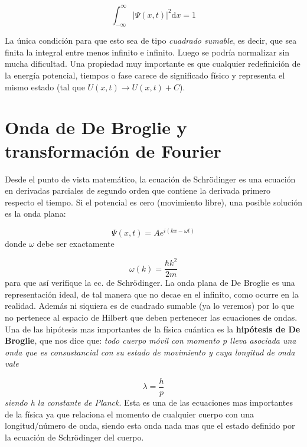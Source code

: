 \documentclass[12pt]{article}
\newcommand{\D}{\mathrm{d}}
\newcommand{\intf}{\int_{-\infty}^{\infty}}
\begin{document}
\begin{equation}
\intf |\Psi (x,t)|^2 \D x = 1
\end{equation}

La única condición para que esto sea de tipo \textit{cuadrado sumable}, es decir, que sea finita la integral entre menos infinito e infinito. Luego se podría normalizar sin mucha dificultad. Una propiedad muy importante es que cualquier redefinición de la energía potencial, tiempos o fase carece de significado físico y representa el mismo estado (tal que $U(x,t) \rightarrow U(x,t) + C$).

\section{Onda de De Broglie y transformación de Fourier}

Desde el punto de vista matemático, la ecuación de Schrödinger es una ecuación en derivadas parciales de segundo orden que contiene la derivada primero respecto el tiempo. Si el potencial es cero (movimiento libre), una posible solución es la onda plana:

\begin{equation}
\Psi (x,t) = A e^{i(kx-\omega t) } \label{Ec:7-ondaplana}
\end{equation}
donde $\omega$ debe ser exactamente

\begin{equation}
\omega (k) = \dfrac{\hbar k^2}{2 m}
\end{equation}
para que así verifique la ec. de Schrödinger. La onda plana de De Broglie es una representación ideal, de tal manera que no decae en el infinito, como ocurre en la realidad. Además ni siquiera es de cuadrado sumable (ya lo veremos) por lo que no pertenece al espacio de Hilbert que deben pertenecer las ecuaciones de ondas. Una de las hipótesis mas importantes de la física cuántica es la \textbf{hipótesis de De Broglie}, que nos dice que: \textit{todo cuerpo móvil con momento p lleva asociada una onda que es consustancial con su estado de movimiento y cuya longitud de onda vale}

\begin{equation}
\lambda = \dfrac{h}{p}
\end{equation}
\textit{siendo h la constante de Planck}. Esta es una de las ecuaciones mas importantes de la física ya que relaciona el momento de cualquier cuerpo con una longitud/número de onda, siendo esta onda nada mas que el estado definido por la ecuación de Schrödinger del cuerpo. \\
\end{document}
